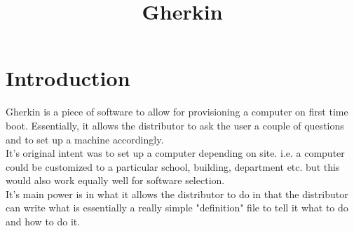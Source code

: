 \documentclass{article}
\begin{document}
\title{Gherkin}
\section{Introduction}
\setcounter{secnumdepth}{5}
Gherkin is a piece of software to allow for provisioning a computer on first
time boot. Essentially, it allows the distributor to ask the user a couple of
questions and to set up a machine accordingly.\\
It's original intent was to set up a computer depending on site. i.e.
a computer could be customized to a particular school, building, department
etc. but this would also work equally well for software selection.\\
It's main power is in what it allows the distributor to do in that
the distributor can write what is essentially a really simple "definition"
file to tell it what to do and how to do it.
\end{document}
